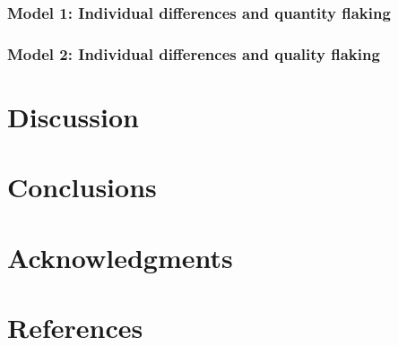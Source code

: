 \documentclass[smallextended]{svjour3}       %
\begin{document}
\hypertarget{model-1-individual-differences-and-quantity-flaking}{%
\subsubsection{\texorpdfstring{\textbf{Model 1: Individual differences
and quantity
flaking}}{Model 1: Individual differences and quantity flaking}}\label{model-1-individual-differences-and-quantity-flaking}}

\hypertarget{model-2-individual-differences-and-quality-flaking}{%
\subsubsection{\texorpdfstring{\textbf{Model 2: Individual differences
and quality
flaking}}{Model 2: Individual differences and quality flaking}}\label{model-2-individual-differences-and-quality-flaking}}

\hypertarget{discussion}{%
\section{\texorpdfstring{\textbf{Discussion}}{Discussion}}\label{discussion}}

\hypertarget{conclusions}{%
\section{\texorpdfstring{\textbf{Conclusions}}{Conclusions}}\label{conclusions}}

\hypertarget{acknowledgments}{%
\section{\texorpdfstring{\textbf{Acknowledgments}}{Acknowledgments}}\label{acknowledgments}}

\hypertarget{references}{%
\section*{\texorpdfstring{\textbf{References}}{References}}\label{references}}
\end{document}
